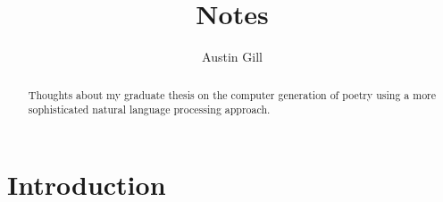 \documentclass{article}
\title{Notes}
\author{Austin Gill}
\begin{document}
\maketitle
\begin{abstract}
    Thoughts about my graduate thesis on the computer generation of poetry using a more
    sophisticated natural language processing approach.
\end{abstract}
\thispagestyle{empty}
\tableofcontents
\newpage

\section{Introduction}\label{sec:introduction}


\newpage\appendix\appendixpage{}\addappheadtotoc{}


\newpage
\nocite{*}

{}
\end{document}
